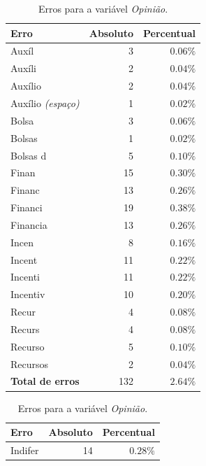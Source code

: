 \documentclass[10pt,a4paper,oneside]{article}
\begin{document}
\begin{table}[!h]
\footnotesize
\centering
\begin{minipage}[t]{0.49\textwidth}
\caption{Erros para a variável \textit{Pagamento}.}
\vspace{0.5em}
\label{table: erros-pagamento}
\begin{tabular}{l r r}
	\toprule
	\textbf{Erro} & \textbf{Absoluto}  & \textbf{Percentual} \\
	\midrule
	Auxíl     		& 3   & $0.06\%$ \\
	Auxíli 	  		& 2   & $0.04\%$ \\
	Auxílio    	 	& 2   & $0.04\%$ \\
	Auxílio \textit{(espaço)}   	& 1   & $0.02\%$ \\
	Bolsa      	 	& 3   & $0.06\%$ \\
	Bolsas     	 	& 1   & $0.02\%$ \\
	Bolsas d   	 	& 5   & $0.10\%$ \\
	Finan      	 	& 15  & $0.30\%$ \\
	Financ     	 	& 13  & $0.26\%$ \\
	Financi    	 	& 19  & $0.38\%$ \\
	Financia   	 	& 13  & $0.26\%$ \\
	Incen      	 	& 8   & $0.16\%$ \\
	Incent     	 	& 11  & $0.22\%$ \\
	Incenti    	 	& 11  & $0.22\%$ \\
	Incentiv   	 	& 10  & $0.20\%$ \\
	Recur      	 	& 4   & $0.08\%$ \\
	Recurs     	 	& 4   & $0.08\%$ \\
	Recurso    	 	& 5   & $0.10\%$ \\
	Recursos   	 	& 2   & $0.04\%$ \\	
	\midrule
	\textbf{Total de erros}  & 132  & $2.64\%$ \\	
	\bottomrule
\end{tabular}
\end{minipage}
%
\begin{minipage}[t]{0.49\textwidth}
\footnotesize
\caption{Erros para a variável \textit{Opinião}.}
\vspace{0.5em}
\label{table: erros-opiniao}
\begin{tabular}{l r r}
	\toprule
	\textbf{Erro} & \textbf{Absoluto}  & \textbf{Percentual} \\
	\midrule
	Indifer    & 14  & $0.28\%$ \\

\end{tabular}
\end{minipage}
\end{table}
\end{document}
